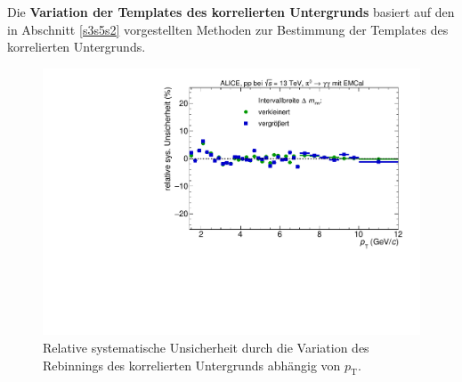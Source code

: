 \newline
Die \textbf{Variation der Templates des korrelierten Untergrunds} basiert auf den in Abschnitt \ref{s3s5s2} vorgestellten Methoden zur Bestimmung der Templates des korrelierten Untergrunds.
\begin{figure}[t!]
\centering
\includegraphics[width=.65\linewidth]{YieldsSysUncerRebinning_Data_2016.pdf}
\caption{Relative systematische Unsicherheit durch die Variation des Rebinnings des korrelierten Untergrunds abhängig von $p_\text{T}$.}
\label{fig:BinningSys}
\end{figure}
